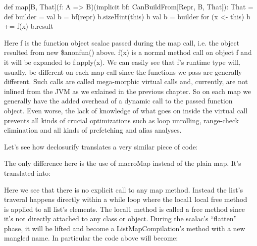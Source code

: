 def map[B, That](f: A => B)(implicit bf: CanBuildFrom[Repr, B, That]): That =
{
    def builder = {
      val b = bf(repr)
      b.sizeHint(this)
      b
    }
    val b = builder
    for (x <- this) b += f(x)
    b.result
}

Here f is the function object scalac passed during the map call, i.e. the
object resulted from new \$anonfun() above. f(x) is a
normal method call on object f and it will be expanded to f.apply(x). We can
easily see that f's runtime type will, usually, be different on each map call
since the functions we pass are generally different. Such calls are called
mega-morphic virtual calls and, currently, are not inlined from the JVM as we
exlained in the previous chapter. So on
each map we generally have the added overhead of a dynamic call to the passed
function object. Even worse, the lack of knowledge of what goes on inside the
virtual call prevents all kinds of crucial optimizations such as loop unrolling,
range-check elimination and all kinds of prefetching and alias analyses.

Let's see how declosurify translates a very similar piece of code:


The only difference here is the use of macroMap instead of the plain map. It's
translated into:


Here we see that there is no explicit call to any map method. Instead the
list's traveral happens directly within a while loop where the local1 local free
method is applied to all list's elements. The local1 method is called a free
method since it's not directly attached to any class or object. During the
scalac's ``flatten'' phase, it will be lifted and become a ListMapCompilation's
method with a new mangled name. In particular the code above will become:

